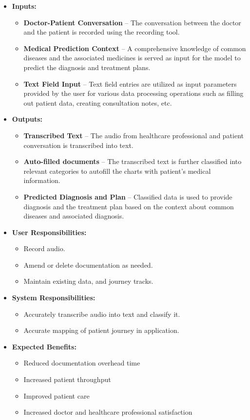 \documentclass[12pt]{article}
\begin{document}
\begin{itemize}
  \item \textbf{Inputs:}
  \begin{itemize}
    \item \textbf{Doctor-Patient Conversation} -- The conversation between the doctor and the patient is recorded using the recording tool.
    \item \textbf{Medical Prediction Context} -- A comprehensive knowledge of common diseases and the associated medicines is served as input for the model to predict the diagnosis and treatment plans.
    \item \textbf{Text Field Input} -- Text field entries are utilized as input parameters provided by the user for various data processing operations such as filling out patient data, creating consultation notes, etc.    
  \end {itemize}
  \item \textbf{Outputs:}
  \begin{itemize} 
    \item \textbf{Transcribed Text} -- The audio from healthcare professional and patient conversation is transcribed into text.
    \item \textbf{Auto-filled documents} -- The transcribed text is further classified into relevant categories to autofill the charts with patient's medical information.
    \item \textbf{Predicted Diagnosis and Plan} -- Classified data is used to provide diagnosis and the treatment plan based on the context about common diseases and associated diagnosis.  
  \end{itemize}
  \item \textbf{User Responsibilities:}
  \begin{itemize}
    \item Record audio.
    \item Amend or delete documentation as needed.
    \item Maintain existing data, and journey tracks.
  \end{itemize}
  \item \textbf{System Responsibilities:}
  \begin{itemize}
    \item Accurately transcribe audio into text and classify it.
    \item Accurate mapping of patient journey in application.
  \end{itemize}

\item{\textbf{Expected Benefits:}}

\begin{itemize}
  \item Reduced documentation overhead time
  \item Increased patient throughput
  \item Improved patient care
  \item Increased doctor and healthcare professional satisfaction
\end{itemize}
\end{itemize}
\end{document}
